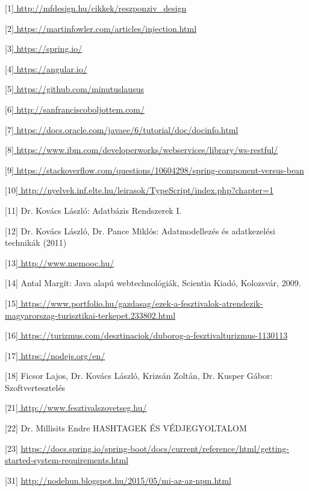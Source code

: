 \begin{thebibliography}{x}




[1]\url{ http://mfdesign.hu/cikkek/reszponziv_design } %

[2]\url{ https://martinfowler.com/articles/injection.html }

[3]\url{ https://spring.io/ }

[4]\url{ https://angular.io/ }

[5]\url{ https://github.com/minutuslausus }

[6]\url{ http://sanfranciscoboljottem.com/ }

[7]\url{ https://docs.oracle.com/javaee/6/tutorial/doc/docinfo.html }

[8]\url{ https://www.ibm.com/developerworks/webservices/library/ws-restful/ }

[9]\url{ https://stackoverflow.com/questions/10604298/spring-component-versus-bean }

[10]\url{ http://nyelvek.inf.elte.hu/leirasok/TypeScript/index.php?chapter=1 }

[11] Dr. Kovács László: Adatbázis Rendszerek I.

[12] Dr. Kovács László, Dr. Pance Miklós: Adatmodellezés és adatkezelési technikák (2011)

[13]\url{ http://www.memooc.hu/ }

[14] Antal Margit: Java alapú webtechnológiák, Scientia Kiadó, Kolozsvár, 2009.

[15]\url{ https://www.portfolio.hu/gazdasag/ezek-a-fesztivalok-atrendezik-magyarorszag-turisztikai-terkepet.233802.html } %

[16]\url{ https://turizmus.com/desztinaciok/duborog-a-fesztivalturizmus-1130113 } %

[17]\url{ https://nodejs.org/en/ }

[18] Ficsor Lajos, Dr. Kovács László, Krizsán Zoltán, Dr. Kusper Gábor: Szoftvertesztelés

[21]\url{ http://www.fesztivalszovetseg.hu/ } %

[22] Dr. Millisits Endre HASHTAGEK ÉS VÉDJEGYOLTALOM

[23] \url{ https://docs.spring.io/spring-boot/docs/current/reference/html/getting-started-system-requirements.html }

[31] \url{ http://nodehun.blogspot.hu/2015/05/mi-az-az-npm.html } %

\end{thebibliography}
